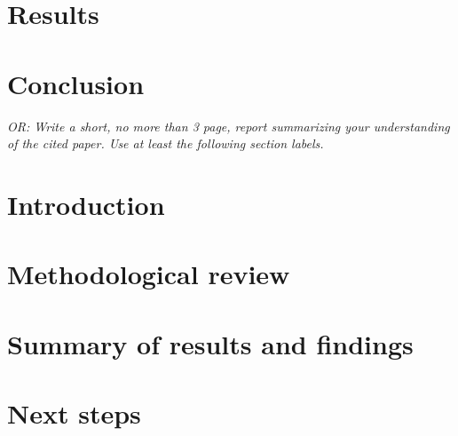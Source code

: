 \documentclass{article}
\begin{document}
\section{Results}
\section{Conclusion}

\emph{OR: Write a short, no more than 3 page, report summarizing your understanding of the cited paper.  Use at least the following section labels.}
\setcounter{section}{0}

\section{Introduction}
\section{Methodological review} 
\section{Summary of results and findings}
\section{Next steps}
\end{document}
